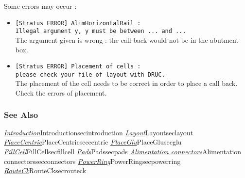 Some errors may occur :
\begin{itemize}
    \item \verb-[Stratus ERROR] AlimHorizontalRail :-\\\verb-Illegal argument y, y must be between ... and ...-\\The argument given is wrong : the call back would not be in the abutment box.
    \item \verb-[Stratus ERROR] Placement of cells :-\\\verb-please check your file of layout with DRUC.-\\The placement of the cell needs to be correct in order to place a call back. Check the errors of placement.
\end{itemize} 

\begin{htmlonly}

\subsubsection{See Also}

\hyperref[ref]{\emph{Introduction}}{}{Introduction}{secintroduction}
\hyperref[ref]{\emph{Layout}}{}{Layout}{seclayout}
\hyperref[ref]{\emph{PlaceCentric}}{}{PlaceCentric}{seccentric}
\hyperref[ref]{\emph{PlaceGlu}}{}{PlaceGlu}{secglu}
\hyperref[ref]{\emph{FillCell}}{}{FillCell}{secfillcell}
\hyperref[ref]{\emph{Pads}}{}{Pads}{secpads}
\hyperref[ref]{\emph{Alimentation connectors}}{}{Alimentation connectors}{secconnectors}
\hyperref[ref]{\emph{PowerRing}}{}{PowerRing}{secpowerring}
\hyperref[ref]{\emph{RouteCk}}{}{RouteCk}{secrouteck}

\end{htmlonly}
